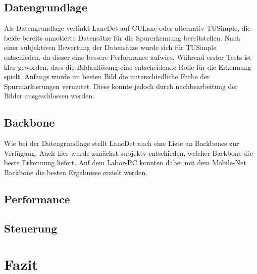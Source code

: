 \documentclass{article}
\begin{document}
        \subsection{Datengrundlage}
            Als Datengrundlage verlinkt LaneDet auf CULane oder alternativ TUSimple, die beide bereits annotierte Datensätze für die Spurerkennung bereitstellen. 
            Nach einer subjektiven Bewertung der Datensätze wurde sich für TUSimple entschieden, da dieser eine bessere Performance aufwies.
            Während erster Tests ist klar geworden, dass die Bildauflösung eine entscheidende Rolle für die Erkennung spielt. Anfangs wurde im besten Bild die unterschiedliche Farbe der Spurmarkierungen vermutet. Diese konnte jedoch durch nachbearbeitung der Bilder ausgeschlossen werden.

        \subsection{Backbone}
            Wie bei der Datengrundlage stellt LaneDet auch eine Liste an Backbones zur Verfügung. Auch hier wurde zunächst subjektv entschieden, welcher Backbone die beste Erkennung liefert.
            Auf dem Labor-PC konnten dabei mit dem Mobile-Net Backbone die besten Ergebnisse erzielt werden.
        \subsection{Performance}


        \subsection{Steuerung}
    \section{Fazit}
\end{document}
